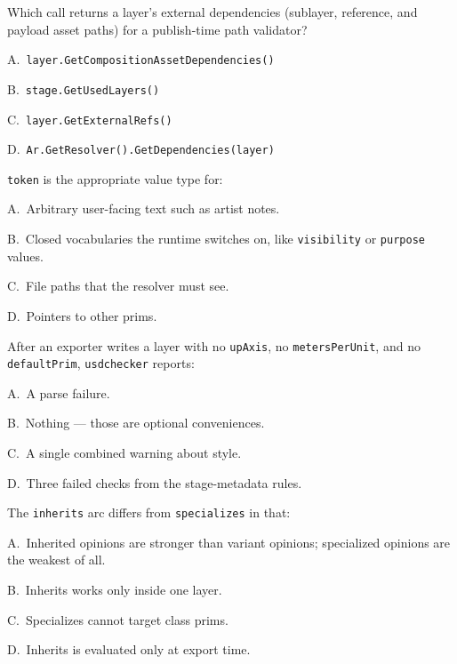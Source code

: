 Which call returns a layer's external dependencies (sublayer, reference,
and payload asset paths) for a publish-time path validator?
\begin{Choices}
  \item A.\ \texttt{layer.GetCompositionAssetDependencies()}
  \item B.\ \texttt{stage.GetUsedLayers()}
  \item C.\ \texttt{layer.GetExternalRefs()}
  \item D.\ \texttt{Ar.GetResolver().GetDependencies(layer)}
\end{Choices}

\texttt{token} is the appropriate value type for:
\begin{Choices}
  \item A.\ Arbitrary user-facing text such as artist notes.
  \item B.\ Closed vocabularies the runtime switches on, like \texttt{visibility} or \texttt{purpose} values.
  \item C.\ File paths that the resolver must see.
  \item D.\ Pointers to other prims.
\end{Choices}

After an exporter writes a layer with no \texttt{upAxis}, no
\texttt{metersPerUnit}, and no \texttt{defaultPrim}, \texttt{usdchecker}
reports:
\begin{Choices}
  \item A.\ A parse failure.
  \item B.\ Nothing --- those are optional conveniences.
  \item C.\ A single combined warning about style.
  \item D.\ Three failed checks from the stage-metadata rules.
\end{Choices}

The \texttt{inherits} arc differs from \texttt{specializes} in that:
\begin{Choices}
  \item A.\ Inherited opinions are stronger than variant opinions; specialized opinions are the weakest of all.
  \item B.\ Inherits works only inside one layer.
  \item C.\ Specializes cannot target class prims.
  \item D.\ Inherits is evaluated only at export time.
\end{Choices}

